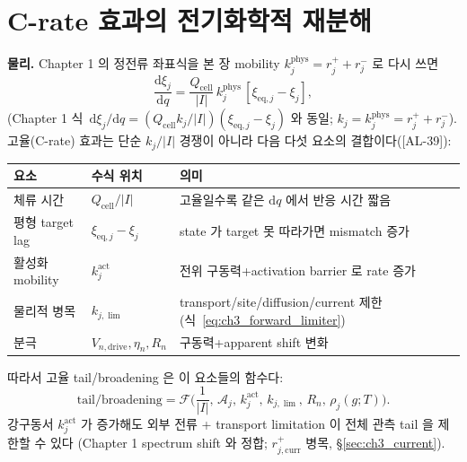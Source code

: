 \documentclass[11pt,a4paper]{article}
\newcommand{\dd}{\mathrm{d}}
\newcommand{\eq}{\mathrm{eq}}
\newcommand{\drive}{\mathrm{drive}}
\newcommand{\cell}{\mathrm{cell}}
\newcommand{\curr}{\mathrm{curr}}
\newcommand{\AL}[1]{\textsf{[AL-#1]}}
\begin{document}
\section{C-rate 효과의 전기화학적 재분해}\label{sec:ch3_crate}
\textbf{물리.} Chapter 1 의 정전류 좌표식을 본 장 mobility $k_j^{\mathrm{phys}}=r_j^++r_j^-$ 로 다시 쓰면
\begin{equation}
\frac{\dd\xi_j}{\dd q}=\frac{Q_\cell}{|I|}\,k_j^{\mathrm{phys}}\,[\xi_{\eq,j}-\xi_j],
\label{eq:ch3_crate}
\end{equation}
(Chapter 1 식~$\dd\xi_j/\dd q=(Q_\cell k_j/|I|)(\xi_{\eq,j}-\xi_j)$ 와 동일; $k_j=k_j^{\mathrm{phys}}=r_j^++r_j^-$).
고율(C-rate) 효과는 단순 $k_j/|I|$ 경쟁이 아니라 다음 다섯 요소의 결합이다(\AL{39}):
\begin{longtable}{p{} >{\raggedright\arraybackslash}p{} >{\raggedright\arraybackslash}p{}}
\toprule 요소 & 수식 위치 & 의미 \\ \midrule \endhead
체류 시간 & $Q_\cell/|I|$ & 고율일수록 같은 $\dd q$ 에서 반응 시간 짧음 \\
평형 target lag & $\xi_{\eq,j}-\xi_j$ & state 가 target 못 따라가면 mismatch 증가 \\
활성화 mobility & $k_j^{\mathrm{act}}$ & 전위 구동력+activation barrier 로 rate 증가 \\
물리적 병목 & $k_{j,\lim}$ & transport/site/diffusion/current 제한(식~\eqref{eq:ch3_forward_limiter}) \\
분극 & $V_{n,\drive},\eta_n,R_n$ & 구동력+apparent shift 변화 \\
\bottomrule
\end{longtable}
따라서 고율 tail/broadening 은 이 요소들의 함수다:
\begin{equation}
\mathrm{tail/broadening}=\mathcal F\!\Big(\frac{1}{|I|},\,\mathcal A_j,\,k_j^{\mathrm{act}},\,k_{j,\lim},\,R_n,\,\rho_j(g;T)\Big).
\label{eq:ch3_tail_function}
\end{equation}
강구동서 $k_j^{\mathrm{act}}$ 가 증가해도 외부 전류 + transport limitation 이 전체 관측 tail 을 제한할 수 있다
(Chapter 1 spectrum shift 와 정합; $r_{j,\curr}^+$ 병목, \S\ref{sec:ch3_current}).

\end{document}
